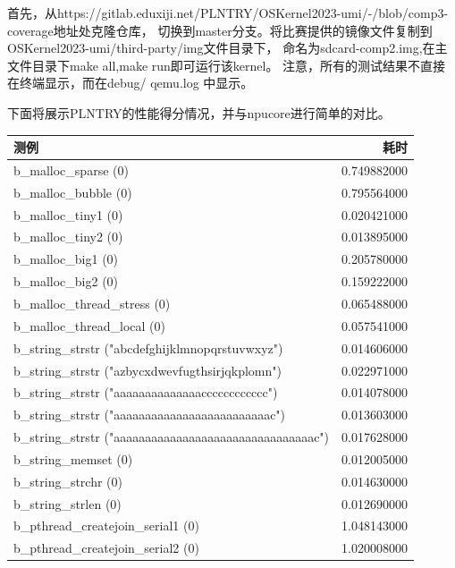 首先，从https://gitlab.eduxiji.net/PLNTRY/OSKernel2023-umi/-/blob/comp3-coverage地址处克隆仓库，
切换到master分支。将比赛提供的镜像文件复制到OSKernel2023-umi/third-party/img文件目录下，
命名为sdcard-comp2.img,在主文件目录下make all,make run即可运行该kernel。
注意，所有的测试结果不直接在终端显示，而在debug/ qemu.log 中显示。

下面将展示PLNTRY的性能得分情况，并与npucore进行简单的对比。

\begin{table}
    \centering
    \begin{tabular}{|l|r|}
        \hline
        测例 & 耗时 \\
        \hline
        b\_malloc\_sparse (0) & 0.749882000 \\
        \hline
        b\_malloc\_bubble (0) & 0.795564000 \\
        \hline
        b\_malloc\_tiny1 (0) & 0.020421000 \\
        \hline
        b\_malloc\_tiny2 (0) & 0.013895000 \\
        \hline
        b\_malloc\_big1 (0) & 0.205780000 \\
        \hline
        b\_malloc\_big2 (0) & 0.159222000 \\
        \hline
        b\_malloc\_thread\_stress (0) & 0.065488000 \\
        \hline
        b\_malloc\_thread\_local (0) & 0.057541000 \\
        \hline
        b\_string\_strstr ("abcdefghijklmnopqrstuvwxyz") & 0.014606000 \\
        \hline
        b\_string\_strstr ("azbycxdwevfugthsirjqkplomn") & 0.022971000 \\
        \hline
        b\_string\_strstr ("aaaaaaaaaaaaaacccccccccccc") & 0.014078000 \\
        \hline
        b\_string\_strstr ("aaaaaaaaaaaaaaaaaaaaaaaaac") & 0.013603000 \\
        \hline
        b\_string\_strstr ("aaaaaaaaaaaaaaaaaaaaaaaaaaaaaaaac") & 0.017628000 \\
        \hline
        b\_string\_memset (0) & 0.012005000 \\
        \hline
        b\_string\_strchr (0) & 0.014630000 \\
        \hline
        b\_string\_strlen (0) & 0.012690000 \\
        \hline
        b\_pthread\_createjoin\_serial1 (0) & 1.048143000 \\
        \hline
        b\_pthread\_createjoin\_serial2 (0) & 1.020008000 \\

\end{tabular}
\end{table}
